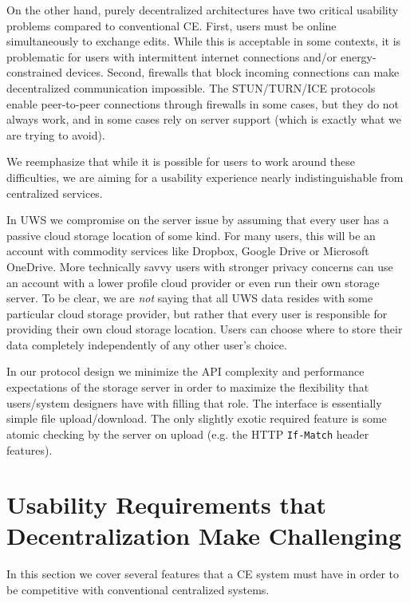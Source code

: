 \documentclass[runningheads]{llncs}
\begin{document}
On the other hand, purely decentralized architectures have two critical usability problems compared to conventional CE.
First, users must be online simultaneously to exchange edits\footnotemark{}.
While this is acceptable in some contexts, it is problematic for users with intermittent internet connections and/or energy-constrained devices.
Second, firewalls that block incoming connections can make decentralized communication impossible.
The STUN{\slash}TURN{\slash}ICE protocols enable peer-to-peer connections through firewalls in some cases, but they do not always work, and in some cases rely on server support (which is exactly what we are trying to avoid).


We reemphasize that while it is possible for users to work around these difficulties, we are aiming for a usability experience nearly indistinguishable from centralized services.

In UWS we compromise on the server issue by assuming that every user has a passive cloud storage location of some kind.
For many users, this will be an account with commodity services like Dropbox, Google Drive or Microsoft OneDrive.
More technically savvy users with stronger privacy concerns can use an account with a lower profile cloud provider or even run their own storage server.
To be clear, we are \emph{not} saying that all UWS data resides with some particular cloud storage provider, but rather that every user is responsible for providing their own cloud storage location.
Users can choose where to store their data completely independently of any other user's choice.

In our protocol design we minimize the API complexity and performance expectations of the storage server in order to maximize the flexibility that users/system designers have with filling that role.
The interface is essentially simple file upload/download.
The only slightly exotic required feature is some atomic checking by the server on upload (e.g. the HTTP \texttt{If-Match} header features).

\section{Usability Requirements that Decentralization Make Challenging}

In this section we cover several features that a CE system must have in order to be competitive with conventional centralized systems.
\end{document}
